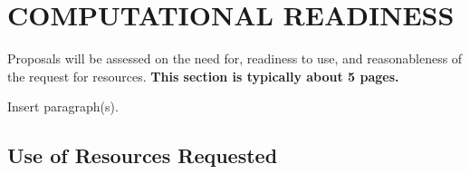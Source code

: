 \documentclass[11pt,letterpaper,english]{article}
\begin{document}
\vspace{-.25in}
\section{COMPUTATIONAL READINESS}
\vspace{-.2in}

Proposals will be assessed on the need for, readiness to use, and reasonableness of the request for resources. {\bf This section is typically about 5 pages.}

Insert paragraph(s).

\vspace{-.25in}
\subsection{Use of Resources Requested}
\vspace{-.2in}
\end{document}
